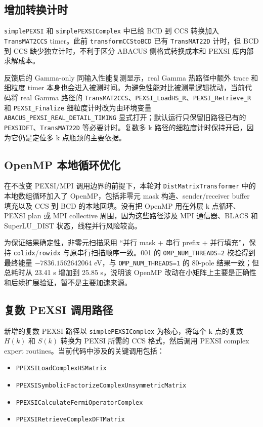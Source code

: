 \documentclass[a4paper,11pt]{article}
\newcommand{\code}[1]{\texttt{#1}}
\begin{document}
\subsection{增加转换计时}

\code{simplePEXSI} 和 \code{simplePEXSIComplex} 中已给 BCD 到 CCS 转换加入 \code{TransMAT2CCS} timer。此前 \code{transformCCStoBCD} 已有 \code{TransMAT22D} 计时，但 BCD 到 CCS 缺少独立计时，不利于区分 ABACUS 侧格式转换成本和 PEXSI 库内部求解成本。

反馈后的 Gamma-only 同输入性能复测显示，real Gamma 热路径中额外 trace 和细粒度 timer 本身也会进入被测时间。为避免性能对比被测量逻辑扰动，当前代码将 real Gamma 路径的 \code{TransMAT2CCS}、\code{PEXSI\_LoadHS\_R}、\code{PEXSI\_Retrieve\_R} 和 \code{PEXSI\_Finalize} 细粒度计时改为由环境变量 \code{ABACUS\_PEXSI\_REAL\_DETAIL\_TIMING} 显式打开；默认运行只保留旧路径已有的 \code{PEXSIDFT}、\code{TransMAT22D} 等必要计时。复数多 k 路径的细粒度计时保持开启，因为它仍是定位多 k 点瓶颈的主要依据。

\subsection{OpenMP 本地循环优化}

在不改变 PEXSI/MPI 调用边界的前提下，本轮对 \code{DistMatrixTransformer} 中的本地数组循环加入了 OpenMP，包括非零元 mask 构造、sender/receiver buffer 填充以及 CCS 到 BCD 的本地回填。没有把 OpenMP 用在外层 k 点循环、PEXSI plan 或 MPI collective 周围，因为这些路径涉及 MPI 通信器、BLACS 和 SuperLU\_DIST 状态，线程并行风险较高。

为保证结果确定性，非零元扫描采用 ``并行 mask + 串行 prefix + 并行填充''，保持 \code{colidx}/\code{rowidx} 与原串行扫描顺序一致。001 的 \code{OMP\_NUM\_THREADS=2} 校验得到最终能量 \(-7836.1562642064\) eV，与 \code{OMP\_NUM\_THREADS=1} 的 80-pole 结果一致；但总耗时从 23.41 s 增加到 25.85 s，说明该 OpenMP 改动在小矩阵上主要是正确性和后续扩展验证，暂不是主要加速来源。

\subsection{复数 PEXSI 调用路径}

新增的复数 PEXSI 路径以 \code{simplePEXSIComplex} 为核心，将每个 k 点的复数 \(H(k)\) 和 \(S(k)\) 转换为 PEXSI 所需的 CCS 格式，然后调用 PEXSI complex expert routines。当前代码中涉及的关键调用包括：

\begin{itemize}
    \item \code{PPEXSILoadComplexHSMatrix}
    \item \code{PPEXSISymbolicFactorizeComplexUnsymmetricMatrix}
    \item \code{PPEXSICalculateFermiOperatorComplex}
    \item \code{PPEXSIRetrieveComplexDFTMatrix}
\end{itemize}
\end{document}
